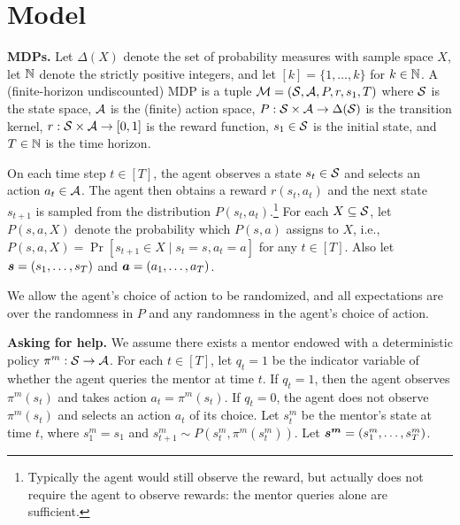 \section{Model}\label{sec:model}

\textbf{MDPs.} Let $\Delta(X)$ denote the set of probability measures with sample space $X$, let $\mathbb{N}$ denote the strictly positive integers, and let $[k] = \{1,\dots,k\}$ for $k \in \mathbb{N}$. A (finite-horizon undiscounted) MDP is a tuple $\mathcal{M} = (\mathcal{S}, \mathcal{A}, P, r, s_1, T)$ where $\mathcal{S}$ is the state space, $\mathcal{A}$ is the (finite) action space, $P: \mathcal{S} \times \mathcal{A} \to \Delta(\mathcal{S})$ is the transition kernel, $r: \mathcal{S} \times \mathcal{A} \to [0,1]$ is the reward function, $s_1 \in \mathcal{S}$ is the initial state, and $T \in \mathbb{N}$ is the time horizon. 

On each time step $t \in [T]$, the agent observes a state $s_t \in \mathcal{S}$ and selects an action $a_t \in \mathcal{A}$. The agent then obtains a reward $r(s_t,a_t)$ and the next state $s_{t+1}$ is sampled from the distribution $P(s_t,a_t)$.\footnote{Typically the agent would still observe the reward, but  actually does not require the agent to observe rewards: the mentor queries alone are sufficient.} For each $X \subseteq \mathcal{S}$,  let $P(s,a,X)$ denote the probability which $P(s,a)$ assigns to $X$, i.e., $P(s,a,X) =\Pr[s_{t+1} \in X \mid s_t = s, a_t = a]$ for any $t \in [T]$. Also let $\boldsymbol{s} = (s_1,\dots,s_T)$ and $\boldsymbol{a} = (a_1,\dots,a_T)$. 


We allow the agent's choice of action to be randomized, and all expectations are over the randomness in $P$ and any randomness in the agent's choice of action.

\textbf{Asking for help.} We assume there exists a mentor endowed with a deterministic policy $\pi^m: \mathcal{S} \to \mathcal{A} $. For each $t \in [T]$, let $q_t=1$ be the indicator variable of whether the agent queries the mentor at time $t$. If $q_t = 1$, then the agent observes $\pi^m(s_t)$ and takes action $a_t = \pi^m(s_t)$. If $q_t = 0$, the agent does not observe $\pi^m(s_t)$ and selects an action $a_t$ of its choice. Let $s_t^m$ be the mentor's state at time $t$, where $s_1^m = s_1$ and $s_{t+1}^m \sim P(s_t^m, \pi^m(s_t^m))$. Let $\boldsymbol{s^m} = (s_1^m,\dots,s_T^m)$.

